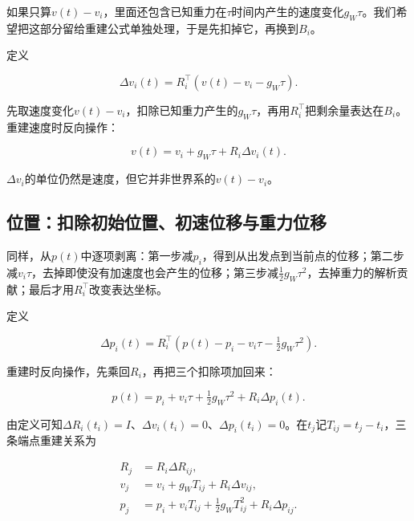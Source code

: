 如果只算$v(t)-v_i$，里面还包含已知重力在$\tau$时间内产生的速度变化$g_W\tau$。我们希望把这部分留给重建公式单独处理，于是先扣掉它，再换到$B_i$。

定义

\begin{equation*}
\Delta v_i(t)=R_i^\top(v(t)-v_i-g_W\tau).
\end{equation*}

先取速度变化$v(t)-v_i$，扣除已知重力产生的$g_W\tau$，再用$R_i^\top$把剩余量表达在$B_i$。重建速度时反向操作：

\begin{equation*}
v(t)=v_i+g_W\tau+R_i\Delta v_i(t).
\end{equation*}

$\Delta v_i$的单位仍然是速度，但它并非世界系的$v(t)-v_i$。

\subsection{位置：扣除初始位置、初速位移与重力位移}

同样，从$p(t)$中逐项剥离：第一步减$p_i$，得到从出发点到当前点的位移；第二步减$v_i\tau$，去掉即使没有加速度也会产生的位移；第三步减$\tfrac12g_W\tau^2$，去掉重力的解析贡献；最后才用$R_i^\top$改变表达坐标。

定义

\begin{equation*}
\Delta p_i(t)=R_i^\top
       (p(t)-p_i-v_i\tau-\tfrac12g_W\tau^2).
\end{equation*}

重建时反向操作，先乘回$R_i$，再把三个扣除项加回来：

\begin{equation*}
p(t)=p_i+v_i\tau+\tfrac12g_W\tau^2+R_i\Delta p_i(t).
\end{equation*}

由定义可知$\Delta R_i(t_i)=I$、$\Delta v_i(t_i)=0$、$\Delta p_i(t_i)=0$。在$t_j$记$T_{ij}=t_j-t_i$，三条端点重建关系为

\begin{equation}\label{eq-preint-reconstruction}
\boxed{
\begin{aligned}
 R_j&=R_i\Delta R_{ij},\\
 v_j&=v_i+g_WT_{ij}+R_i\Delta v_{ij},\\
 p_j&=p_i+v_iT_{ij}+\tfrac12g_WT_{ij}^2+R_i\Delta p_{ij}.
\end{aligned}}
\end{equation}

